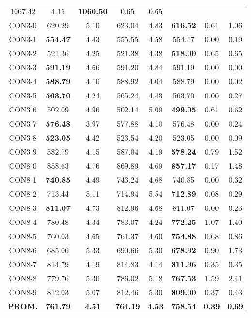 \begin{table}[h]
\begin{tabular}{c c c c c c c c}
1067.42 & 4.15 & \bf{1060.50} & 
0.65 & 0.65\\CON3-0 & 620.29 & 5.10 & 
623.04 & 4.83 & \bf{616.52} & 
0.61 & 1.06\\CON3-1 & \bf{554.47} & 4.43 & 
555.55 & 4.58 & 554.47 & 0.00
 & 0.19\\CON3-2 & 521.36 & 4.25 & 
521.38 & 4.38 & \bf{518.00} & 
0.65 & 0.65\\CON3-3 & \bf{591.19} & 4.66 & 
591.20 & 4.84 & 591.19 & 0.00
 & 0.00\\CON3-4 & \bf{588.79} & 4.10 & 
588.92 & 4.04 & 588.79 & 0.00
 & 0.02\\CON3-5 & \bf{563.70} & 4.24 & 
565.24 & 4.43 & 563.70 & 0.00
 & 0.27\\CON3-6 & 502.09 & 4.96 & 
502.14 & 5.09 & \bf{499.05} & 
0.61 & 0.62\\CON3-7 & \bf{576.48} & 3.97 & 
577.88 & 4.10 & 576.48 & 0.00
 & 0.24\\CON3-8 & \bf{523.05} & 4.42 & 
523.54 & 4.20 & 523.05 & 0.00
 & 0.09\\CON3-9 & 582.79 & 4.15 & 
587.04 & 4.19 & \bf{578.24} & 
0.79 & 1.52\\CON8-0 & 858.63 & 4.76 & 
869.89 & 4.69 & \bf{857.17} & 
0.17 & 1.48\\CON8-1 & \bf{740.85} & 4.49 & 
743.24 & 4.68 & 740.85 & 0.00
 & 0.32\\CON8-2 & 713.44 & 5.11 & 
714.94 & 5.54 & \bf{712.89} & 
0.08 & 0.29\\CON8-3 & \bf{811.07} & 4.73 & 
812.96 & 4.68 & 811.07 & 0.00
 & 0.23\\CON8-4 & 780.48 & 4.34 & 
783.07 & 4.24 & \bf{772.25} & 
1.07 & 1.40\\CON8-5 & 760.03 & 4.65 & 
761.37 & 4.60 & \bf{754.88} & 
0.68 & 0.86\\CON8-6 & 685.06 & 5.33 & 
690.66 & 5.30 & \bf{678.92} & 
0.90 & 1.73\\CON8-7 & 814.79 & 4.19 & 
814.83 & 4.14 & \bf{811.96} & 
0.35 & 0.35\\CON8-8 & 779.76 & 5.30 & 
786.02 & 5.18 & \bf{767.53} & 
1.59 & 2.41\\CON8-9 & 812.03 & 5.07 & 
812.46 & 5.30 & \bf{809.00} & 
0.37 & 0.43\\\bf{PROM.} & 
\bf{761.79} & \bf{4.51} & \bf{764.19} & \bf{4.53} & \bf{758.54} & \bf{0.39} & \bf{0.69}\\[1ex]\hline
\end{tabular}
\label{table:nonlin}
\end{table}
